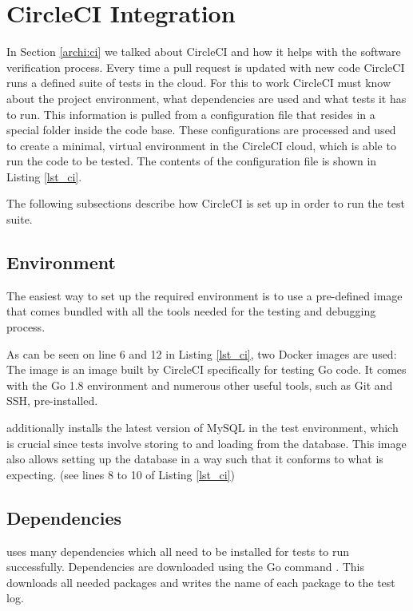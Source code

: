\section{CircleCI Integration}
\label{impl_ci}

In Section \ref{archi:ci} we talked about CircleCI and how it helps with the software verification process. Every time a pull request is updated with new code CircleCI runs a defined suite of tests in the cloud. For this to work CircleCI must know about the project environment, what dependencies are used and what tests it has to run. This information is pulled from a configuration file that resides in a special folder inside the \lcs code base. These configurations are processed and used to create a minimal, virtual environment in the CircleCI cloud, which is able to run the code to be tested. The contents of the configuration file is shown in Listing \ref{lst_ci}.

The following subsections describe how CircleCI is set up in order to run the test suite. 



\subsection{Environment}
The easiest way to set up the required environment is to use a pre-defined  image that comes bundled with all the tools needed for the testing and debugging process.

As can be seen on line 6 and 12 in Listing \ref{lst_ci}, two Docker images are used:
The  image is an image built by CircleCI specifically for testing Go code. It comes with the Go 1.8 environment and numerous other useful tools, such as Git and SSH, pre-installed.

 additionally installs the latest version of MySQL in the test environment, which is crucial since tests involve storing to and loading from the database. This image also allows setting up the database in a way such that it conforms to what \lcs is expecting. (see lines 8 to 10 of Listing \ref{lst_ci})

\subsection{Dependencies}
\lcs uses many dependencies which all need to be installed for tests to run successfully. Dependencies are downloaded using the Go command . This downloads all needed packages and writes the name of each package to the test log.

